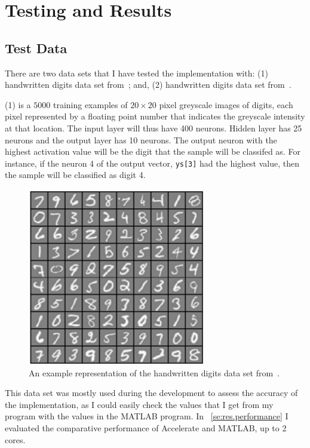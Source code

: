\chapter{Testing and Results}\label{ch:results}

\section{Test Data}\label{se:res.testdata}
There are two data sets that I have tested the implementation with: (1) handwritten digits data set from~\cite{Ng12}; and, (2) handwritten digits data set from~\cite{LeCCorBur}.

(1) is a $5000$ training examples of $20 \times 20$ pixel greyscale images of digits, each pixel represented by a floating point number that indicates the greyscale intensity at that location. The input layer will thus have 400 neurons. Hidden layer has 25 neurons and the output layer has 10 neurons. The output neuron with the highest activation value will be the digit that the sample will be classifed as. For instance, if the neuron 4 of the output vector, \texttt{ys[3]} had the highest value, then the sample will be classified as digit 4.

\begin{figure}
	\centerline{\includegraphics{ng-dataset.png}}
	\caption{An example representation of the handwritten digits data set from~\cite{Ng12}.}
	\label{fig:ng.data}
\end{figure}

This data set was mostly used during the development to assess the accuracy of the implementation, as I could easily check the values that I get from my program with the values in the MATLAB program. In ~\ref{se:res.performance} I evaluated the comparative performance of Accelerate and MATLAB, up to 2 cores.

